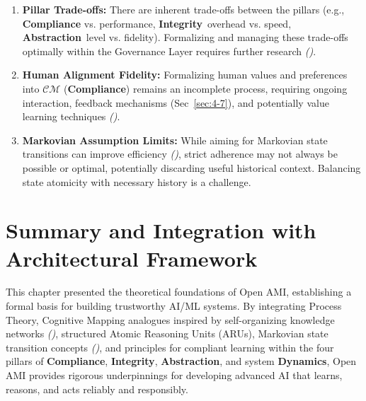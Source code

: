 \documentclass[12pt,a4paper]{report}
\renewcommand{\citep}[1]{\textit{\scriptsize{(\cite{#1})}}}
\newcommand{\Integrity}{\textbf{Integrity}}
\newcommand{\Abstraction}{\textbf{Abstraction}}
\newcommand{\Dynamics}{\textbf{Dynamics}}
\begin{document}
\begin{enumerate}
		\item \textbf{Pillar Trade-offs:} There are inherent trade-offs between the pillars (e.g., \textbf{Compliance} vs. performance, \Integrity\ overhead vs. speed, \Abstraction\ level vs. fidelity). Formalizing and managing these trade-offs optimally within the Governance Layer requires further research \citep{Sekrst2024Guardrails}.
		\item \textbf{Human Alignment Fidelity:} Formalizing human values and preferences into $\mathcal{CM}$ (\textbf{Compliance}) remains an incomplete process, requiring ongoing interaction, feedback mechanisms (Sec~\ref{sec:4-7}), and potentially value learning techniques \citep{Kovac2025SpecGaming}.
		\item \textbf{Markovian Assumption Limits:} While aiming for Markovian state transitions can improve efficiency \citep{Teng2025AtomOfThoughtsRef}, strict adherence may not always be possible or optimal, potentially discarding useful historical context. Balancing state atomicity with necessary history is a challenge.
	\end{enumerate}
	
	\section{Summary and Integration with Architectural Framework}
	\label{sec:2-13}
	
	This chapter presented the theoretical foundations of Open AMI, establishing a formal basis for building trustworthy AI/ML systems. By integrating Process Theory, Cognitive Mapping analogues inspired by self-organizing knowledge networks \citep{Buehler2025AgenticGraphRef}, structured Atomic Reasoning Units (ARUs), Markovian state transition concepts \citep{Teng2025AtomOfThoughtsRef}, and principles for compliant learning within the four pillars of \textbf{Compliance}, \Integrity, \Abstraction, and system \Dynamics, Open AMI provides rigorous underpinnings for developing advanced AI that learns, reasons, and acts reliably and responsibly.
	
\end{document}
